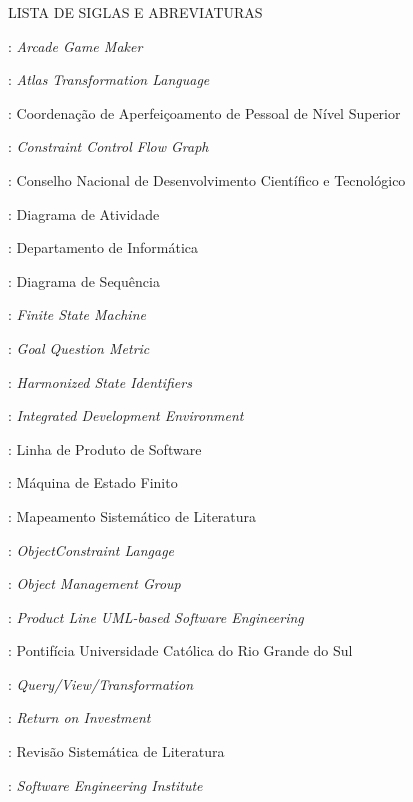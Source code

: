 \pagestyle{empty}
\large
\begin{center}
	LISTA DE SIGLAS E ABREVIATURAS
\end{center}

\normalsize

: \textit{Arcade Game Maker}

: \textit{Atlas Transformation Language}

: Coordenação de Aperfeiçoamento de Pessoal de Nível Superior

: \textit{Constraint Control Flow Graph}

: Conselho Nacional de Desenvolvimento Científico e Tecnológico

: Diagrama de Atividade

: Departamento de Informática

: Diagrama de Sequência

: \textit{Finite State Machine}

: \textit{Goal Question Metric}

: \textit{Harmonized State Identifiers}

: \textit{Integrated Development Environment}

: Linha de Produto de Software

: Máquina de Estado Finito

: Mapeamento Sistemático de Literatura

: \textit{ObjectConstraint Langage}

: \textit{Object Management Group}

: \textit{Product Line UML-based Software Engineering}

: Pontifícia Universidade Católica do Rio Grande do Sul

: \textit{Query/View/Transformation}

: \textit{Return on Investment}

: Revisão Sistemática de Literatura

: \textit{Software Engineering Institute}

